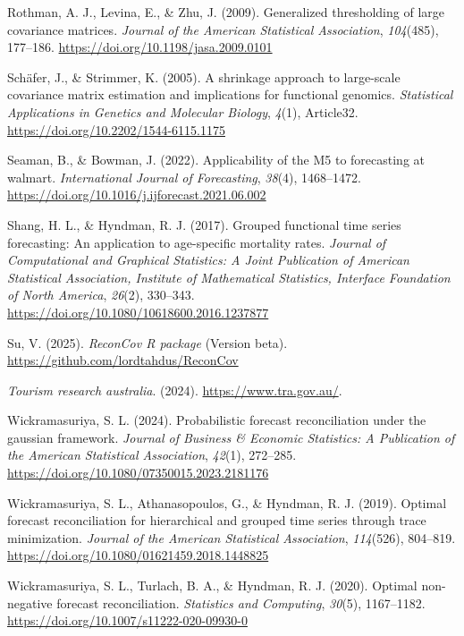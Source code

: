 \documentclass[
  11pt,
  letterpaper,
  DIV=11,
  numbers=noendperiod,
  titlepage]{scrartcl}
\newlength{\cslhangindent}
\newenvironment{CSLReferences}[2] %
 {\begin{list}{}{%
  \setlength{\itemindent}{0pt}
  \setlength{\leftmargin}{0pt}
  \setlength{\parsep}{0pt}
  \ifodd #1
   \setlength{\leftmargin}{\cslhangindent}
   \setlength{\itemindent}{-1\cslhangindent}
  \fi
  \setlength{\itemsep}{#2\baselineskip}}}
 {\end{list}}
\begin{document}
\begin{CSLReferences}{1}{0}
Rothman, A. J., Levina, E., \& Zhu, J. (2009). Generalized thresholding
of large covariance matrices. \emph{Journal of the American Statistical
Association}, \emph{104}(485), 177--186.
\url{https://doi.org/10.1198/jasa.2009.0101}

Schäfer, J., \& Strimmer, K. (2005). A shrinkage approach to large-scale
covariance matrix estimation and implications for functional genomics.
\emph{Statistical Applications in Genetics and Molecular Biology},
\emph{4}(1), Article32. \url{https://doi.org/10.2202/1544-6115.1175}

Seaman, B., \& Bowman, J. (2022). Applicability of the {M5} to
forecasting at walmart. \emph{International Journal of Forecasting},
\emph{38}(4), 1468--1472.
\url{https://doi.org/10.1016/j.ijforecast.2021.06.002}

Shang, H. L., \& Hyndman, R. J. (2017). Grouped functional time series
forecasting: An application to age-specific mortality rates.
\emph{Journal of Computational and Graphical Statistics: A Joint
Publication of American Statistical Association, Institute of
Mathematical Statistics, Interface Foundation of North America},
\emph{26}(2), 330--343.
\url{https://doi.org/10.1080/10618600.2016.1237877}

Su, V. (2025). \emph{{ReconCov} {R} package} (Version beta).
\url{https://github.com/lordtahdus/ReconCov}

\emph{Tourism research australia}. (2024).
\url{https://www.tra.gov.au/}.

Wickramasuriya, S. L. (2024). Probabilistic forecast reconciliation
under the gaussian framework. \emph{Journal of Business \& Economic
Statistics: A Publication of the American Statistical Association},
\emph{42}(1), 272--285.
\url{https://doi.org/10.1080/07350015.2023.2181176}

Wickramasuriya, S. L., Athanasopoulos, G., \& Hyndman, R. J. (2019).
Optimal forecast reconciliation for hierarchical and grouped time series
through trace minimization. \emph{Journal of the American Statistical
Association}, \emph{114}(526), 804--819.
\url{https://doi.org/10.1080/01621459.2018.1448825}

Wickramasuriya, S. L., Turlach, B. A., \& Hyndman, R. J. (2020). Optimal
non-negative forecast reconciliation. \emph{Statistics and Computing},
\emph{30}(5), 1167--1182.
\url{https://doi.org/10.1007/s11222-020-09930-0}

\end{CSLReferences}
\end{document}
